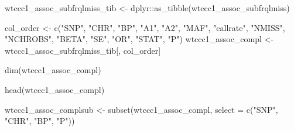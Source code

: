 \documentclass[
]{book}
\newenvironment{Shaded}{\begin{snugshade}}{\end{snugshade}}
\newcommand{\AttributeTok}[1]{\textcolor[rgb]{0.77,0.63,0.00}{#1}}
\newcommand{\FunctionTok}[1]{\textcolor[rgb]{0.00,0.00,0.00}{#1}}
\newcommand{\NormalTok}[1]{#1}
\newcommand{\OtherTok}[1]{\textcolor[rgb]{0.56,0.35,0.01}{#1}}
\newcommand{\SpecialCharTok}[1]{\textcolor[rgb]{0.00,0.00,0.00}{#1}}
\newcommand{\StringTok}[1]{\textcolor[rgb]{0.31,0.60,0.02}{#1}}
\begin{document}
\begin{Shaded}
\begin{Highlighting}[]
\NormalTok{wtccc1\_assoc\_subfrqlmiss\_tib }\OtherTok{\textless{}{-}}\NormalTok{ dplyr}\SpecialCharTok{::}\FunctionTok{as\_tibble}\NormalTok{(wtccc1\_assoc\_subfrqlmiss)}

\NormalTok{col\_order }\OtherTok{\textless{}{-}} \FunctionTok{c}\NormalTok{(}\StringTok{"SNP"}\NormalTok{, }\StringTok{"CHR"}\NormalTok{, }\StringTok{"BP"}\NormalTok{,}
               \StringTok{"A1"}\NormalTok{, }\StringTok{"A2"}\NormalTok{, }\StringTok{"MAF"}\NormalTok{, }\StringTok{"callrate"}\NormalTok{, }\StringTok{"NMISS"}\NormalTok{, }\StringTok{"NCHROBS"}\NormalTok{,}
               \StringTok{"BETA"}\NormalTok{, }\StringTok{"SE"}\NormalTok{, }\StringTok{"OR"}\NormalTok{, }\StringTok{"STAT"}\NormalTok{, }\StringTok{"P"}\NormalTok{)}
\NormalTok{wtccc1\_assoc\_compl }\OtherTok{\textless{}{-}}\NormalTok{ wtccc1\_assoc\_subfrqlmiss\_tib[, col\_order]}

\FunctionTok{dim}\NormalTok{(wtccc1\_assoc\_compl)}

\FunctionTok{head}\NormalTok{(wtccc1\_assoc\_compl)}

\NormalTok{wtccc1\_assoc\_complsub }\OtherTok{\textless{}{-}} \FunctionTok{subset}\NormalTok{(wtccc1\_assoc\_compl, }\AttributeTok{select =} \FunctionTok{c}\NormalTok{(}\StringTok{"SNP"}\NormalTok{, }\StringTok{"CHR"}\NormalTok{, }\StringTok{"BP"}\NormalTok{, }\StringTok{"P"}\NormalTok{))}
\end{Highlighting}
\end{Shaded}
\end{document}
